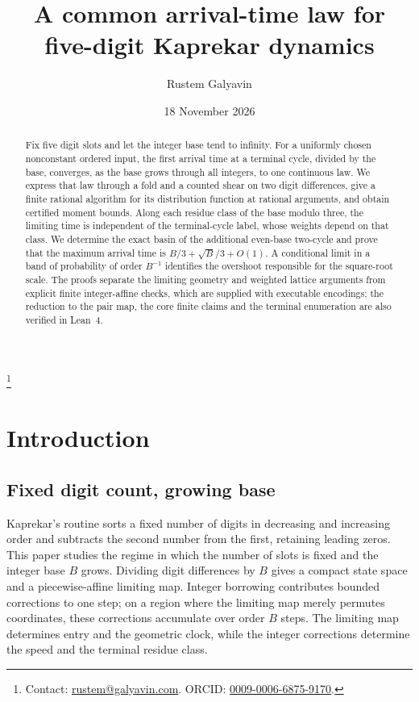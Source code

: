 \documentclass[11pt]{amsart}
\begin{document}
\title{A common arrival-time law for five-digit Kaprekar dynamics}
\author{Rustem Galyavin}
\thanks{Contact: \href{mailto:rustem@galyavin.com}{rustem@galyavin.com}. ORCID: \href{https://orcid.org/0009-0006-6875-9170}{0009-0006-6875-9170}.}
\date{18 November 2026}

\begin{abstract}
Fix five digit slots and let the integer base tend to infinity. For a uniformly chosen nonconstant ordered input, the first arrival time at a terminal cycle, divided by the base, converges, as the base grows through all integers, to one continuous law. We express that law through a fold and a counted shear on two digit differences, give a finite rational algorithm for its distribution function at rational arguments, and obtain certified moment bounds. Along each residue class of the base modulo three, the limiting time is independent of the terminal-cycle label, whose weights depend on that class. We determine the exact basin of the additional even-base two-cycle and prove that the maximum arrival time is \(B/3+\sqrt B/3+O(1)\). A conditional limit in a band of probability of order \(B^{-1}\) identifies the overshoot responsible for the square-root scale. The proofs separate the limiting geometry and weighted lattice arguments from explicit finite integer-affine checks, which are supplied with executable encodings; the reduction to the pair map, the core finite claims and the terminal enumeration are also verified in Lean~4.
\end{abstract}

\maketitle

\section{Introduction}

\subsection{Fixed digit count, growing base}

Kaprekar's routine sorts a fixed number of digits in decreasing and increasing order and subtracts the second number from the first, retaining leading zeros. This paper studies the regime in which the number of slots is fixed and the integer base \(B\) grows. Dividing digit differences by \(B\) gives a compact state space and a piecewise-affine limiting map. Integer borrowing contributes bounded corrections to one step; on a region where the limiting map merely permutes coordinates, these corrections accumulate over order \(B\) steps. The limiting map determines entry and the geometric clock, while the integer corrections determine the speed and the terminal residue class.
\end{document}
